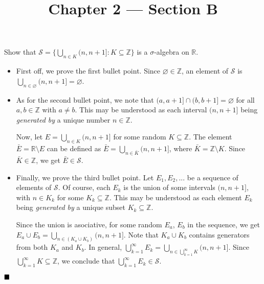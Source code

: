 \documentclass[11pt, a4paper, tikz]{article}
\newcommand{\centsection}[1]{
	\section*{\centering{#1}}
}
\renewcommand{\qed}{\hfill\blacksquare}
\newcommand{\Bigcup}[2]{\displaystyle \bigcup_{#1}^{#2}}
\newcommand{\integers}{
	\ensuremath{\mathbb{Z}}
}
\newcommand{\reals}{
	\ensuremath{\mathbb{R}}
}
\newcommand{\sigmaAlgebra}[1]{
	\ensuremath{\mathcal{#1}}
}
\begin{document}
	\title{\textbf{Chapter 2 — Section B}}
	\maketitle
	\centsection{Exercise 1}
	
	\begin{formulationBox}
		Show that $\sigmaAlgebra{S} = \{\bigcup_{n\in K}(n, n+1]:K\subseteq\integers\}$ is a $\sigma$-algebra on $\reals$.
	\end{formulationBox}

	\begin{itemize}
	\item First off, we prove the first bullet point. Since $\varnothing\in\integers$, an element of $\sigmaAlgebra{S}$ is $\bigcup_{n\in\varnothing}(n, n+1] = \varnothing$.
	
	\item As for the second bullet point, we note that $(a, a+1]\cap(b, b+1] = \varnothing$ for all $a,b\in\integers$ with $a\neq b$. This may be understood as each interval $(n, n+1]$ being \textit{generated by} a unique number $n\in\integers$.
	
	Now, let $E = \bigcup_{n\in K}(n, n+1]$ for some random $K\subseteq\integers$. The element $\bar{E} = \reals\setminus E$ can be defined as $\bar{E} = \bigcup_{n\in \bar{K}}(n, n+1]$, where $\bar{K} = \integers\setminus K$. Since $\bar{K}\in\integers$, we get $\bar{E}\in\sigmaAlgebra{S}$.
	
	\item Finally, we prove the third bullet point. Let $E_1, E_2, ...$ be a sequence of elements of $\sigmaAlgebra{S}$. Of course, each $E_k$ is the union of some intervals $(n, n+1]$, with $n\in K_k$ for some $K_k\subseteq\integers$. This may be understood as each element $E_k$ being \textit{generated by} a unique subset $K_k\subseteq\integers$.
	
	Since the union is asociative, for some random $E_a$, $E_b$ in the sequence, we get $E_a\cup E_b = \bigcup_{n\in(K_a\cup K_b)}(n, n+1]$. Note that $K_a\cup K_b$ contains generators from both $K_a$ and $K_b$. In general, $\Bigcup{k=1}{\infty}E_k = \bigcup_{n\in\bigcup_{k=1}^{\infty}K}(n, n+1]$. Since $\bigcup_{k=1}^{\infty}K \subseteq \integers$, we conclude that $\bigcup_{k=1}^{\infty}E_k \in \sigmaAlgebra{S}$.
	
	\end{itemize}
	
	$\qed$
\end{document}
